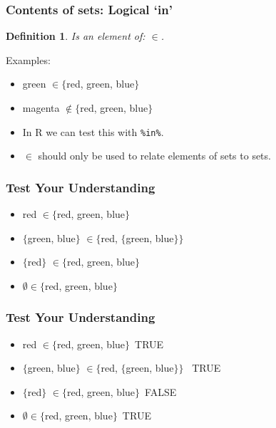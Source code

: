 \documentclass[aspectratio=169]{beamer}
\newtheorem{defn}{Definition}
\numberwithin{equation}{section}
\begin{document}
\begin{frame}
\frametitle{Contents of sets: Logical `in'}

\begin{defn}
Is an element of: $\in$.
\end{defn}
\pause

{Examples: } \pause
\begin{itemize}
\item green $\in \{$red, green, blue$\}$
\item magenta $\not\in \{$red, green, blue$\}$\pause
\item In R we can test this with \texttt{\%in\%}.
\item $\in$ should only be used to relate elements of sets to sets.
\end{itemize}
   
\end{frame}



\begin{frame}
\frametitle{Test Your Understanding}

\begin{itemize}
\item red $\in \{$red, green, blue$\}$
\item $\{$green, blue$\}$ $\in \{$red, $\{$green, blue$\}\}$
\item $\{$red$\}$ $\in \{$red, green, blue$\}$
\item $\emptyset \in \{$red, green, blue$\}$
\end{itemize}
   
\end{frame}


\begin{frame}
\frametitle{Test Your Understanding}

\begin{itemize}
\item red $\in \{$red, green, blue$\}$\ TRUE
\item $\{$green, blue$\}$ $\in \{$red, $\{$green, blue$\}\}$ \ TRUE
\item $\{$red$\}$ $\in \{$red, green, blue$\}$\ FALSE
\item $\emptyset \in \{$red, green, blue$\}$\ TRUE
\end{itemize}
   
\end{frame}
\end{document}

